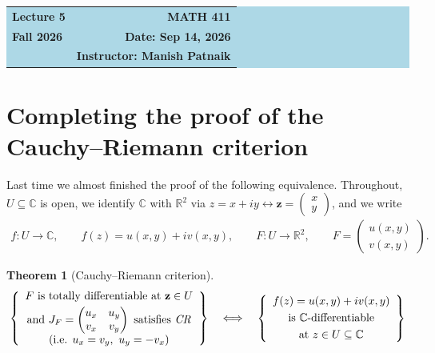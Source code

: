 \documentclass[11pt]{article}
\theoremstyle{plain}
\newtheorem{theorem}{Theorem}[section]
\theoremstyle{definition}
\theoremstyle{remark}
\numberwithin{equation}{section}
\newcommand{\be}{\begin{eqnarray}}
\newcommand{\ee}{\end{eqnarray}}
\newcommand{\C}{\mathbb{C}}
\newcommand{\R}{\mathbb{R}}
\newcommand{\zz}{\mathbf z}
\begin{document}
\begin{center}
  \colorbox{lightblue}{%
    \begin{minipage}{0.94\textwidth}
      \vspace{0.55em}
      \begin{tabular*}{\textwidth}{@{\extracolsep{\fill}}lr}
        {\color{courseblue}\bfseries\LARGE Lecture 5} &
        {\color{courseblue}\bfseries\LARGE MATH 411}\\[0.35em]
        \textbf{Fall 2026} & \textbf{Date: Sep 14, 2026}\\
        & \textbf{Instructor: Manish Patnaik}
      \end{tabular*}
      \vspace{0.45em}
    \end{minipage}}
\end{center}

\setcounter{tocdepth}{1}
\tableofcontents
\vspace{0.45em}

\section{Completing the proof of the Cauchy--Riemann criterion}
Last time we almost finished the proof of the following equivalence.
Throughout, $U\subseteq\C$ is open, we identify $\C$ with $\R^2$ via
$z=x+iy\leftrightarrow\zz=\begin{pmatrix}x\\y\end{pmatrix}$, and we write
\be
 f:U\to\C,\qquad f(z)=u(x,y)+iv(x,y),\qquad
 F:U\to\R^2,\qquad F=\begin{pmatrix}u(x,y)\\v(x,y)\end{pmatrix}.
\ee

\begin{theorem}[Cauchy--Riemann criterion]
\label{thm:CR}
\be
 \left\{
 \begin{array}{c}
 F\text{ is totally differentiable at }\zz\in U\\[0.3em]
 \text{and }J_F=\begin{pmatrix}u_x&u_y\\v_x&v_y\end{pmatrix}
 \text{ satisfies \emph{CR}}\\[0.3em]
 \text{(i.e. }u_x=v_y,\ u_y=-v_x\text{)}
 \end{array}
 \right\}
 \quad\Longleftrightarrow\quad
 \left\{
 \begin{array}{c}
 f(z)=u(x,y)+iv(x,y)\\[0.3em]
 \text{is }\C\text{-differentiable}\\[0.3em]
 \text{at }z\in U\subseteq\C
 \end{array}
 \right\}
\ee
\end{theorem}
\end{document}
